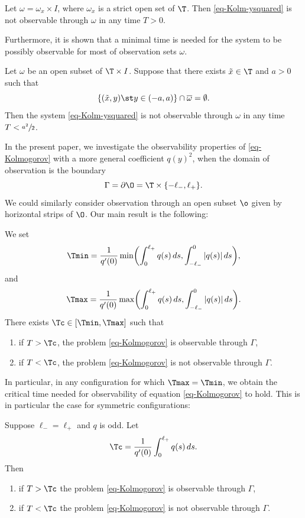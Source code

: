 \begin{theorem} \label{th-AK1}
Let $\omega = \omega_x \times I$, where $\omega_x$ is a strict open set of $\T$.
Then \eqref{eq-Kolm-ysquared} is not observable through $\omega$ in any time $T>0$.
\end{theorem}

Furthermore, it is shown that a minimal time is needed for the system to be possibly observable for most of observation sets $\omega$.

\begin{theorem} \label{th-AK2}
Let $\omega$ be an open subset of $\T \times I$. Suppose that there exists $\tilde x \in \T$ and $a > 0$ such that
\[\lbrace (\tilde x ,y)\st y \in (-a,a)\rbrace \cap \overline{\omega} = \emptyset.\]
Then the system \eqref{eq-Kolm-ysquared} is not observable through $\omega$ in any time $T< \sfrac{a^2}{2}$.
\end{theorem}

In the present paper, we investigate the observability properties of
\eqref{eq-Kolmogorov} with a more general coefficient $q(y)^2$, when the domain of observation is the boundary
\[
\Gamma = \partial \O = \T \times\lbrace -\ell_-, \ell_+\rbrace.
\]
We could similarly consider observation through an open subset $\o$ given by horizontal strips of $\O$. Our main result is the following:

\begin{theorem} \label{th-main}
We set
\[
\Tmin = \frac 1 {q'(0)} \min\biggl(\int_0^{\ell_+} q(s) \, ds , \int_{-\ell_-}^0 \vert q(s) \vert\, ds \biggr),
\]
and
\[
\Tmax = \frac 1 {q'(0)} \max\biggl(\int_0^{\ell_+} q(s) \, ds , \int_{-\ell_-}^0 \vert q(s) \vert\, ds \biggr).
\]
There exists $\Tc \in [\Tmin,\Tmax]$ such that
\begin{enumerate}
\item if $T > \Tc$, the problem \eqref{eq-Kolmogorov} is observable through $\Gamma$, \label{item-th-i}
\item if $T < \Tc$, the problem \eqref{eq-Kolmogorov} is not observable through $\Gamma$. \label{item-th-ii}
\end{enumerate}
\end{theorem}

In particular, in any configuration for which $\Tmax=\Tmin$, we obtain the critical time needed
for observability of equation \eqref{eq-Kolmogorov} to hold. This is in particular the case for symmetric configurations:

\begin{theorem} \label{th-cas-symetrique}
Suppose $\ell_- = \ell_+$ and $q$ is odd. Let
\[
\Tc = \frac{1}{q'(0)} \int_0^{\ell_+} q(s) \, ds.
\]
Then
\begin{enumerate}
\item if $T > \Tc$ the problem \eqref{eq-Kolmogorov} is observable through $\Gamma$,
\item if $T < \Tc$ the problem \eqref{eq-Kolmogorov} is not observable through $\Gamma$.
\end{enumerate}
\end{theorem}

